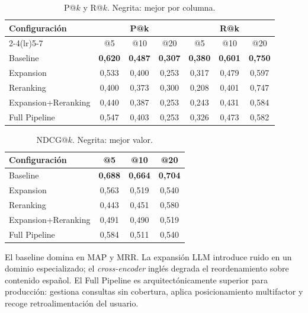 \documentclass[runningheads]{llncs}
\begin{document}
\begin{table}[t]
\centering
\caption{P@$k$ y R@$k$. Negrita: mejor por columna.}
\label{tab:prk}
\setlength{\tabcolsep}{5pt}
\begin{tabular}{lcccccc}
\toprule
\multirow{2}{*}{\textbf{Configuraci\'on}}
  & \multicolumn{3}{c}{\textbf{P@k}} & \multicolumn{3}{c}{\textbf{R@k}} \\
\cmidrule(lr){2-4}\cmidrule(lr){5-7}
  & @5 & @10 & @20 & @5 & @10 & @20 \\
\midrule
Baseline            & \textbf{0{,}620} & \textbf{0{,}487} & \textbf{0{,}307} & \textbf{0{,}380} & \textbf{0{,}601} & \textbf{0{,}750} \\
Expansion           & 0{,}533 & 0{,}400 & 0{,}253 & 0{,}317 & 0{,}479 & 0{,}597 \\
Reranking           & 0{,}400 & 0{,}373 & 0{,}300 & 0{,}208 & 0{,}401 & 0{,}747 \\
Expansion+Reranking & 0{,}440 & 0{,}387 & 0{,}253 & 0{,}243 & 0{,}431 & 0{,}584 \\
Full Pipeline       & 0{,}547 & 0{,}403 & 0{,}253 & 0{,}326 & 0{,}473 & 0{,}582 \\
\bottomrule
\end{tabular}
\end{table}

\begin{table}[t]
\centering
\caption{NDCG@$k$. Negrita: mejor valor.}
\label{tab:ndcg}
\begin{tabular}{lccc}
\toprule
\textbf{Configuraci\'on} & \textbf{@5} & \textbf{@10} & \textbf{@20} \\
\midrule
Baseline            & \textbf{0{,}688} & \textbf{0{,}664} & \textbf{0{,}704} \\
Expansion           & 0{,}563 & 0{,}519 & 0{,}540 \\
Reranking           & 0{,}443 & 0{,}451 & 0{,}580 \\
Expansion+Reranking & 0{,}491 & 0{,}490 & 0{,}519 \\
Full Pipeline       & 0{,}584 & 0{,}511 & 0{,}540 \\
\bottomrule
\end{tabular}
\end{table}

El baseline domina en MAP y MRR. La expansi\'on LLM introduce ruido en
un dominio especializado; el \textit{cross-encoder} ingl\'es degrada el
reordenamiento sobre contenido espa\~nol. El Full Pipeline es
arquitect\'onicamente superior para producci\'on: gestiona consultas sin
cobertura, aplica posicionamiento multifactor y recoge retroalimentaci\'on
del usuario.
\end{document}
